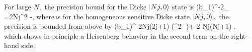 For large $N,$ the precision bound for the Dicke $\vert{Nj,0}\rangle$ state is
\be
\label{eq:gm-exact precision bound for dicke ih state}
(\Delta b_1)^{-2}_{\max} =2Nj\lpar \sigma^2
-\eta\rpar,
\ee
whereas for the homogeneous sensitive Dicke state $\vert{Nj,0}\rangle_x$ the precision is bounded from above by
\be
(\Delta b_1)^{-2}\leqslant Nj(2j+1) (\sigma^2 -\eta)+ 2 Nj(Nj+1) \eta,
\ee
which shows in principle a Heisenberg behavior in the second term on
the right-hand side.
%
%
%
%
%
%
%
%


